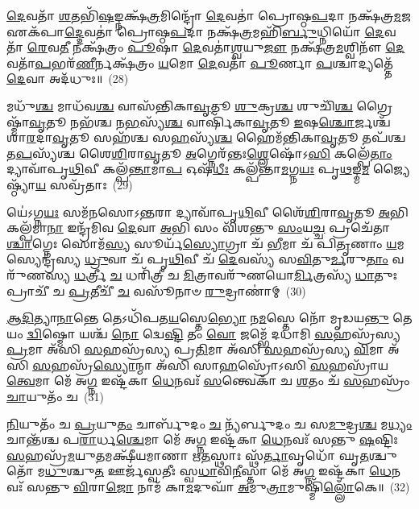 \-\ul{𑌦𑍇}\-𑌵𑌤𑌾᳴ \ul{𑌶}\-𑌤𑌭𑌿᳴\-\ul{𑌷}\-𑌙𑍍𑌨𑌕𑍍𑌷᳴\-\ul{𑌤𑍍𑌰}\-𑌮𑌿𑌨𑍍𑌦𑍍𑌰𑍋᳴ \ul{𑌦𑍇}\-𑌵𑌤𑌾॑ 𑌪𑍍𑌰𑍋𑌷𑍍𑌠\-\ul{𑌪}\-𑌦𑌾 𑌨𑌕𑍍𑌷᳴𑌤𑍍𑌰\-\ul{𑌮}\-𑌜 𑌏𑌕᳴𑌪𑌾\-\ul{𑌦𑍍𑌦𑍇}\-𑌵𑌤𑌾॑ 𑌪𑍍𑌰𑍋𑌷𑍍𑌠\-\ul{𑌪}\-𑌦𑌾 𑌨𑌕𑍍𑌷᳴\-\ul{𑌤𑍍𑌰}\-𑌮𑌹𑌿᳴\-\ul{𑌰𑍍𑌬𑍁}\-𑌧𑍍𑌨𑌿𑌯𑍋᳴ \ul{𑌦𑍇}\-𑌵𑌤𑌾᳴ \ul{𑌰𑍇}\-𑌵\-\ul{𑌤𑍀} 𑌨𑌕𑍍𑌷᳴𑌤𑍍𑌰𑌂 \ul{𑌪𑍂}\-𑌷𑌾 \ul{𑌦𑍇}\-𑌵𑌤𑌾॑\-\ul{𑌶𑍍𑌵}\-𑌯𑍁\-\ul{𑌜𑍗} 𑌨𑌕𑍍𑌷᳴𑌤𑍍𑌰\-\ul{𑌮}\-𑌶𑍍𑌵𑌿𑌨𑍗᳴ \ul{𑌦𑍇}\-𑌵𑌤𑌾᳴\-\ul{𑌪}\-𑌭𑌰᳴\-\ul{𑌣𑍀}\-𑌰𑍍𑌨𑌕𑍍𑌷᳴𑌤𑍍𑌰𑌂 \ul{𑌯}\-𑌮𑍋 \ul{𑌦𑍇}\-𑌵𑌤𑌾᳴ \ul{𑌪𑍂}\-𑌰𑍍𑌣𑌾 \ul{𑌪}\-𑌶𑍍𑌚𑌾𑌦𑍍𑌯𑌤𑍍𑌤𑍇᳴ \ul{𑌦𑍇}\-𑌵𑌾 𑌅𑌦᳴𑌧𑍁𑌃॥~(28)

{\anuvakamend[{𑌫𑌲𑍍𑌗𑍁᳴\-\ul{𑌨𑍀} 𑌨𑌕𑍍𑌷᳴\-\ul{𑌤𑍍𑌰𑌂} 𑌵𑌸᳴\-\ul{𑌵}\-𑌸𑍍𑌤𑍍𑌰𑌯᳴𑌸𑍍𑌤𑍍𑌰𑌿𑍞𑌶𑌚𑍍𑌚}]}%

𑌮𑌧𑍁᳴\-\ul{𑌶𑍍𑌚} 𑌮𑌾𑌧᳴𑌵\-\ul{𑌶𑍍𑌚} 𑌵𑌾𑌸᳴𑌨𑍍𑌤𑌿𑌕𑌾\-\ul{𑌵𑍃}\-𑌤𑍂 \ul{𑌶𑍁}\-𑌕𑍍𑌰\-\ul{𑌶𑍍𑌚} 𑌶𑍁𑌚𑌿᳴\-\ul{𑌶𑍍𑌚} 𑌗𑍍𑌰𑍈𑌷𑍍𑌮𑌾᳴\-\ul{𑌵𑍃}\-𑌤𑍂 𑌨𑌭᳴𑌶𑍍𑌚 𑌨\-\ul{𑌭}\-𑌸𑍍𑌯᳴\-\ul{𑌶𑍍𑌚} 𑌵𑌾𑌰𑍍\mbox{}𑌷𑌿᳴𑌕𑌾\-\ul{𑌵𑍃}\-𑌤𑍂 \ul{𑌇}\-𑌷\-\ul{𑌶𑍍𑌚𑍋}\-𑌰𑍍𑌜𑌶𑍍𑌚᳴ 𑌶𑌾\-\ul{𑌰}\-𑌦𑌾\-\ul{𑌵𑍃}\-𑌤𑍂 𑌸𑌹᳴𑌶𑍍𑌚 𑌸\-\ul{𑌹}\-𑌸𑍍𑌯᳴\-\ul{𑌶𑍍𑌚} 𑌹𑍈𑌮᳴𑌨𑍍𑌤𑌿𑌕𑌾\-\ul{𑌵𑍃}\-𑌤𑍂 𑌤𑌪᳴𑌶𑍍𑌚 𑌤\-\ul{𑌪}\-𑌸𑍍𑌯᳴𑌶𑍍𑌚 𑌶𑍈\-\ul{𑌶𑌿}\-𑌰𑌾\-\ul{𑌵𑍃}\-𑌤𑍂 \ul{𑌅}\-𑌗𑍍𑌨𑍇𑌰᳴𑌨𑍍𑌤𑌃\-\ul{𑌶𑍍𑌲𑍇}\-𑌷𑍋᳴\-𑌽\-\ul{𑌸𑌿} 𑌕𑌲𑍍𑌪𑍇᳴\-\ul{𑌤𑌾𑌂} 𑌦𑍍𑌯𑌾𑌵𑌾᳴𑌪𑍃\-\ul{𑌥𑌿}\-𑌵𑍀 𑌕𑌲𑍍𑌪᳴\-\ul{𑌨𑍍𑌤𑌾}\-𑌮𑌾\-\ul{𑌪} 𑌓𑌷᳴\-\ul{𑌧𑍀𑌃} 𑌕𑌲𑍍𑌪᳴𑌨𑍍𑌤𑌾\-\ul{𑌮}\-𑌗𑍍𑌨\-\ul{𑌯𑌃} 𑌪𑍃\-\ul{𑌥}\-𑌙𑍍𑌮\-\ul{𑌮} 𑌜𑍍𑌯𑍈𑌷𑍍𑌠𑍍𑌯𑌾᳴\-\ul{𑌯} 𑌸𑌵𑍍𑌰᳴𑌤𑌾𑌃~(29)

𑌯𑍇॑\-𑌽𑌗𑍍𑌨\-\ul{𑌯𑌃} 𑌸𑌮᳴𑌨𑌸𑍋\-𑌽\-\ul{𑌨𑍍𑌤}\-𑌰𑌾 𑌦𑍍𑌯𑌾𑌵𑌾᳴𑌪𑍃\-\ul{𑌥𑌿}\-𑌵𑍀 𑌶𑍈᳴\-\ul{𑌶𑌿}\-𑌰𑌾\-\ul{𑌵𑍃}\-𑌤𑍂 \ul{𑌅}\-𑌭𑌿 𑌕𑌲𑍍𑌪᳴𑌮𑌾\-\ul{𑌨𑌾} 𑌇𑌨𑍍𑌦𑍍𑌰᳴𑌮𑌿𑌵 \ul{𑌦𑍇}\-𑌵𑌾 \ul{𑌅}\-𑌭𑌿 𑌸𑌂 𑌵𑌿᳴𑌶𑌨𑍍𑌤𑍁 \ul{𑌸𑌂}\-𑌯\-\ul{𑌚𑍍𑌚} 𑌪𑍍𑌰𑌚𑍇᳴𑌤𑌾\-\ul{𑌶𑍍𑌚𑌾}\-𑌗𑍍𑌨𑍇𑌃 𑌸𑍋𑌮᳴\-\ul{𑌸𑍍𑌯} 𑌸𑍂𑌰𑍍𑌯᳴\-\ul{𑌸𑍍𑌯𑍋}\-𑌗𑍍𑌰𑌾 𑌚᳴ \ul{𑌭𑍀}\-𑌮𑌾 𑌚᳴ 𑌪𑌿\-\ul{𑌤𑍃}\-𑌣𑌾𑌂 \ul{𑌯}\-𑌮𑌸𑍍𑌯𑍇𑌨𑍍𑌦𑍍𑌰᳴𑌸𑍍𑌯 \ul{𑌧𑍍𑌰𑍁}\-𑌵𑌾 𑌚᳴ 𑌪𑍃\-\ul{𑌥𑌿}\-𑌵𑍀 𑌚᳴ \ul{𑌦𑍇}\-𑌵𑌸𑍍𑌯᳴ 𑌸\-\ul{𑌵𑌿}\-𑌤𑍁\-\ul{𑌰𑍍𑌮}\-𑌰𑍁\-\ul{𑌤𑌾𑌂} 𑌵𑌰𑍁᳴𑌣𑌸𑍍𑌯 \ul{𑌧}\-𑌰𑍍𑌤𑍍𑌰𑍀 \ul{𑌚} 𑌧𑌰𑌿᳴𑌤𑍍𑌰𑍀 𑌚 \ul{𑌮𑌿}\-𑌤𑍍𑌰𑌾𑌵𑌰𑍁᳴𑌣𑌯𑍋\-\ul{𑌰𑍍𑌮𑌿}\-𑌤𑍍𑌰𑌸𑍍𑌯᳴ \ul{𑌧𑌾}\-𑌤𑍁𑌃 𑌪𑍍𑌰𑌾𑌚𑍀᳴ 𑌚 \ul{𑌪𑍍𑌰}\-𑌤𑍀𑌚𑍀᳴ \ul{𑌚} 𑌵𑌸𑍂᳴𑌨𑌾𑍞 \ul{𑌰𑍁}\-𑌦𑍍𑌰𑌾𑌣𑌾॑𑌮𑍍~(30)

\-\ul{𑌆}\-\-\ul{𑌦𑌿}\-𑌤𑍍𑌯𑌾\-\ul{𑌨𑌾}\-𑌨𑍍𑌤𑍇 𑌤𑍇\-𑌽𑌧𑌿᳴𑌪𑌤\-\ul{𑌯}\-𑌸𑍍𑌤𑍇\-\ul{𑌭𑍍𑌯𑍋} 𑌨\-\ul{𑌮}\-𑌸𑍍𑌤𑍇 𑌨𑍋᳴ 𑌮𑍃𑌡𑌯\-\ul{𑌨𑍍𑌤𑍁} 𑌤𑍇 𑌯𑌂 \ul{𑌦𑍍𑌵𑌿}\-𑌷𑍍𑌮𑍋 𑌯𑌶𑍍𑌚᳴ \ul{𑌨𑍋} 𑌦𑍍𑌵𑍇\-\ul{𑌷𑍍𑌟𑌿} 𑌤𑌂 \ul{𑌵𑍋} 𑌜𑌮𑍍𑌭𑍇᳴ 𑌦𑌧𑌾𑌮𑌿 \ul{𑌸}\-𑌹𑌸𑍍𑌰᳴𑌸𑍍𑌯 \ul{𑌪𑍍𑌰}\-𑌮𑌾 𑌅᳴𑌸𑌿 \ul{𑌸}\-𑌹𑌸𑍍𑌰᳴𑌸𑍍𑌯 𑌪𑍍𑌰\-\ul{𑌤𑌿}\-𑌮𑌾 𑌅᳴𑌸𑌿 \ul{𑌸}\-𑌹𑌸𑍍𑌰᳴𑌸𑍍𑌯 \ul{𑌵𑌿}\-𑌮𑌾 𑌅᳴𑌸𑌿 \ul{𑌸}\-𑌹𑌸𑍍𑌰᳴\-\ul{𑌸𑍍𑌯𑍋}\-𑌨𑍍𑌮𑌾 𑌅᳴𑌸𑌿 𑌸𑌾\-\ul{𑌹}\-𑌸𑍍𑌰𑍋᳴\-𑌽𑌸𑌿 \ul{𑌸}\-𑌹𑌸𑍍𑌰𑌾᳴𑌯 \ul{𑌤𑍍𑌵𑍇}\-𑌮𑌾 𑌮𑍇᳴ 𑌅\-\ul{𑌗𑍍𑌨} 𑌇𑌷𑍍𑌟᳴𑌕𑌾 \ul{𑌧𑍇}\-𑌨𑌵𑌃᳴ \ul{𑌸}\-𑌨𑍍𑌤𑍍𑌵𑍇𑌕𑌾᳴ 𑌚 \ul{𑌶}\-𑌤𑌂 𑌚᳴ \ul{𑌸}\-𑌹𑌸𑍍𑌰𑌂᳴ \ul{𑌚𑌾}\-𑌯𑍁𑌤𑌂᳴ 𑌚~(31)

\-\ul{𑌨𑌿}\-𑌯𑍁𑌤𑌂᳴ 𑌚 \ul{𑌪𑍍𑌰}\-𑌯𑍁\-\ul{𑌤𑌂} 𑌚𑌾𑌰𑍍𑌬𑍁᳴𑌦𑌂 \ul{𑌚} 𑌨𑍍𑌯᳴𑌰𑍍𑌬𑍁𑌦𑌂 𑌚 𑌸\-\ul{𑌮𑍁}\-𑌦𑍍𑌰\-\ul{𑌶𑍍𑌚} 𑌮\-\ul{𑌧𑍍𑌯𑌂} 𑌚𑌾𑌨𑍍𑌤᳴𑌶𑍍𑌚 𑌪\-\ul{𑌰𑌾}\-𑌰𑍍𑌧\-\ul{𑌶𑍍𑌚𑍇}\-𑌮𑌾 𑌮𑍇᳴ 𑌅\-\ul{𑌗𑍍𑌨} 𑌇𑌷𑍍𑌟᳴𑌕𑌾 \ul{𑌧𑍇}\-𑌨𑌵𑌃᳴ 𑌸𑌨𑍍𑌤𑍁 \ul{𑌷}\-𑌷𑍍𑌟𑌿𑌃 \ul{𑌸}\-𑌹𑌸𑍍𑌰᳴\-\ul{𑌮}\-𑌯𑍁\-\ul{𑌤}\-𑌮𑌕𑍍𑌷𑍀᳴𑌯𑌮𑌾𑌣𑌾 𑌋\-\ul{𑌤}\-𑌸𑍍𑌥𑌾𑌃 𑌸𑍍𑌥᳴\-\ul{𑌰𑍍𑌤𑌾}\-𑌵𑍃𑌧𑍋᳴ 𑌘𑍃\-\ul{𑌤}\-𑌶𑍍𑌚𑍁𑌤𑍋᳴ 𑌮\-\ul{𑌧𑍁}\-𑌶𑍍𑌚𑍁\-\ul{𑌤} 𑌊𑌰𑍍𑌜᳴𑌸𑍍𑌵𑌤𑍀𑌃 𑌸𑍍𑌵\-\ul{𑌧𑌾}\-𑌵𑌿\-\ul{𑌨𑍀}\-𑌸𑍍𑌤𑌾 𑌮𑍇᳴ 𑌅\-\ul{𑌗𑍍𑌨} 𑌇𑌷𑍍𑌟᳴𑌕𑌾 \ul{𑌧𑍇}\-𑌨𑌵𑌃᳴ 𑌸𑌨𑍍𑌤𑍁 \ul{𑌵𑌿}\-𑌰𑌾\-\ul{𑌜𑍋} 𑌨𑌾𑌮᳴ 𑌕𑌾\-\ul{𑌮}\-𑌦𑍁𑌘𑌾᳴ \ul{𑌅}\-𑌮𑍁\-\ul{𑌤𑍍𑌰𑌾}\-𑌮𑍁𑌷𑍍𑌮𑌿᳴\-\ul{𑌲𑍍𑌲𑍋𑌁}\-𑌕𑍇॥~(32)

